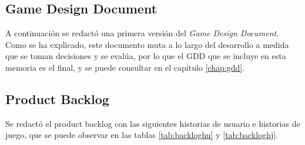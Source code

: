 \subsection{Game Design Document}

A continuación se redactó una primera versión del \textit{Game Design Document}. Como se ha explicado, este documento muta a lo largo del desarrollo a medida que se toman decisiones y se evalúa, por lo que el GDD que se incluye en esta memoria es el final, y se puede consultar en el capítulo \ref{chap:gdd}.

\subsection{Product Backlog}

Se redactó el product backlog con las siguientes historias de usuario e historias de juego, que se puede observar en las tablas \ref{tab:backloghu} y \ref{tab:backloghj}.


